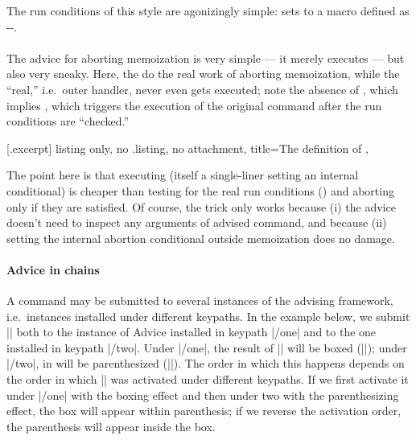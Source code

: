 \documentclass[a4paper,11pt]{article}
\begin{document}
The run conditions of this style are agonizingly simple:  sets  to a macro defined as
\hyp{}\hyp{}.

\paragraph{}

The advice for aborting memoization is very simple --- it merely executes
 --- but also very sneaky.  Here, the  do the real work of aborting memoization, while the ``real,''
i.e.\ outer handler, never even gets executed; note the absence of
, which implies , which triggers
the execution of the original command after the run conditions are ``checked.''

[.excerpt]{%
  listing only, no .listing, no attachment,
  title={The definition of },
}

The point here is that executing  (itself a single-liner
setting an internal conditional) is cheaper than testing for the real run
conditions () and aborting only if they are
satisfied.  Of course, the trick only works because (i) the advice doesn't
need to inspect any arguments of advised command, and because (ii) setting the
internal abortion conditional outside memoization does no damage.

\paragraph{Advice in chains}

A command may be submitted to several instances of the advising framework,
i.e.\ instances installed under different keypaths.  In the example below, we
submit |\foo| both to the instance of Advice installed in keypath |/one| and to
the one installed in keypath |/two|.  Under |/one|, the result of ||
will be boxed (|\fboxWrap|); under |/two|, in will be parenthesized
(|\parenWrap|).  The order in which this happens depends on the order in which
|\foo| was activated under different keypaths.  If we first activate it under
|/one| with the boxing effect and then under two with the parenthesizing
effect, the box will appear within parenthesis; if we reverse the activation
order, the parenthesis will appear inside the box.
\end{document}
